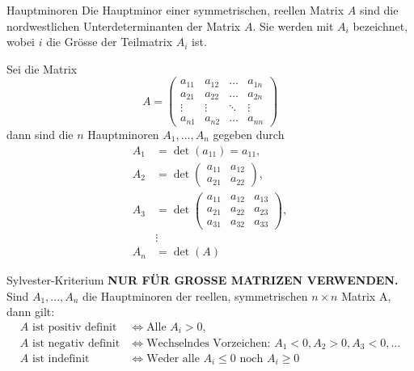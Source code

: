 \begin{Definition}{Hauptminoren}{}
	Die Hauptminor einer symmetrischen, reellen Matrix $A$ sind die nordwestlichen Unterdeterminanten der Matrix $A$. Sie werden mit $A_i$ bezeichnet, wobei $i$ die Grösse der Teilmatrix $A_i$ ist. 
	
	Sei die Matrix
	\[
		A = \begin{pmatrix}
            a_{11} & a_{12} & \hdots & a_{1n}\\
            a_{21} & a_{22} & \hdots & a_{2n}\\
            \vdots & \vdots & \ddots & \vdots\\
            a_{n1} & a_{n2} & \hdots & a_{nn}
        \end{pmatrix}
	\]
	dann sind die $n$ Hauptminoren $A_1, ..., A_n$ gegeben durch
	\begin{align*}
		A_1 &= \det(a_{11}) = a_{11},\\
		A_2 &= \det\begin{pmatrix}
            a_{11} & a_{12} \\
            a_{21} & a_{22}
            \end{pmatrix},\\
       	A_3 &= \det\begin{pmatrix}
            a_{11} & a_{12} & a_{13} \\
            a_{21} & a_{22}& a_{23}\\
            a_{31} & a_{32}& a_{33}
            \end{pmatrix},\\
            &\vdots\\
        A_n &= \det(A)
    \end{align*}
\end{Definition}

\begin{Satz}{Sylvester-Kriterium}{}
	\textbf{NUR FÜR GROSSE MATRIZEN VERWENDEN.}
	Sind $A_1, ..., A_n$ die Hauptminoren der reellen, symmetrischen $n \times n$ Matrix A, dann gilt:
	\begin{align*}
		A \text{ ist positiv definit} &\iff \text{Alle }A_i > 0,\\
		A \text{ ist negativ definit} &\iff \text{Wechselndes Vorzeichen: }A_1 < 0, A_2 > 0, A_3 < 0,...\\
		A \text{ ist indefinit} &\iff \text{Weder alle }A_i \leq 0 \text{ noch }A_i \geq 0 
	\end{align*}
\end{Satz}

